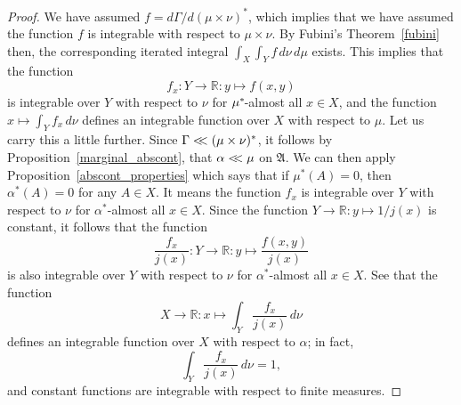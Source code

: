 \documentclass[
twoside=true,
paper=letter,
fontsize=11pt,
pagesize=auto,
leqno,
openany,
headsepline,
overfullrule,
]{scrbook}
\theoremstyle{plain}
\theoremstyle{plain}
\theoremstyle{definition}
\theoremstyle{bfnoteitalic}
\theoremstyle{bfnoteroman}
\newcommand{\sigalg}[1]{\mathfrak{#1}}
\newcommand{\R}{\mathbb{R}}
\newcommand{\sigmaalgebra}{\sigalg{A}}
\newcommand{\kernast}{\ast\kern-1pt}
\newcommand{\funcf}{f}
\newcommand{\funcj}{j}
\newcommand{\function}{f}
\newcommand{\measurespace}{X}
\newcommand{\measurespaceii}{Y}
\newcommand{\mspaceelt}{x}
\newcommand{\mspaceeltii}{y}
\newcommand{\abscont}{\mathrel{< \kern-3.5pt <}}
\newcommand{\measure}{\mu}
\newcommand{\measureii}{\nu}
\newcommand{\seti}{A}
\newcommand{\measonprod}{\Gamma}%
\newcommand{\marginalone}{\alpha}%
\begin{document}
\begin{proof}
We have assumed
$\function = d\measonprod / d(\measure\times\measureii)^*$,
which implies that we have assumed the function $\function$ is integrable with respect to 
$\measure\times\measureii$.
By Fubini's Theorem~\ref{fubini} then, the corresponding iterated integral
$\int_\measurespace\int_\measurespaceii \funcf \,d\measureii\,d\measure$
exists.
This implies that the function 
\[
\function_\mspaceelt:\measurespaceii\to\R :
\mspaceeltii\mapsto\function(\mspaceelt,\mspaceeltii)
\]
is integrable over $\measurespaceii$ with respect to $\measureii$ for 
$\measure^\kernast$-almost all 
$\mspaceelt\in\measurespace$,
and the function 
$\mspaceelt\mapsto 
\int_\measurespaceii \function_\mspaceelt \, d\measureii$ 
defines an integrable function over $\measurespace$ with respect to $\measure$.
Let us carry this
a little further.  
Since $\measonprod \abscont (\measure\times\measureii)^*$, it follows by Proposition~\ref{marginal_abscont}, that 
$\marginalone\abscont\measure$ on $\sigmaalgebra$.
We can then apply Proposition~\ref{abscont_properties} which says that if
$\measure^*(\seti)=0$, then $\marginalone^*(\seti)=0$ for any $\seti\in\measurespace$.
It means the function 
$\function_\mspaceelt$ 
is integrable over $\measurespaceii$ with respect to $\measureii$ for 
$\marginalone^*$-almost all $\mspaceelt\in\measurespace$.
Since the function
$\measurespaceii\to\R:\mspaceeltii\mapsto 1/ \funcj(\mspaceelt)$ 
is  constant, it follows that the function
\[
\frac{\function_\mspaceelt}{\funcj(\mspaceelt)} :
\measurespaceii\to\R :
\mspaceeltii\mapsto
\frac{\function(\mspaceelt,\mspaceeltii)}{\funcj(\mspaceelt)}
\]
is also integrable over $\measurespaceii$ with respect to $\measureii$ for 
$\marginalone^*$-almost all $\mspaceelt\in\measurespace$.
See that the function
\[
\measurespace\to\R :
\mspaceelt \mapsto 
\int_\measurespaceii 
\frac{\function_\mspaceelt}{\funcj(\mspaceelt)} 
\, d\measureii
\]
defines an integrable function over $\measurespace$ with respect to 
$\marginalone$; in fact,
\[
\int_\measurespaceii 
\frac{\function_\mspaceelt}{\funcj(\mspaceelt)} 
\, d\measureii
= 1,
\]
and constant functions are integrable with respect to finite measures.


\end{proof}
\end{document}

